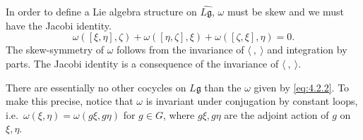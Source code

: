 \documentclass[12pt]{article}
\begin{document}
In order to define a Lie algebra structure on $\widehat{L\mathfrak{g}}$, $\omega$ must be skew and we must have the Jacobi identity. 
\begin{equation}\label{eq:jacobi}
    \omega([\xi,\eta],\zeta) + \omega([\eta,\zeta],\xi) + \omega([\zeta,\xi],\eta) = 0.
\end{equation}
The skew-symmetry of $\omega$ follows from the invariance of $\langle \ , \ \rangle$ and integration by parts. The Jacobi identity is a consequence of the invariance of $\langle \ , \ \rangle$.

There are essentially no other cocycles on $L\mathfrak{g}$ than the $\omega$ given
by \eqref{eq:4.2.2}. To make this precise, notice that $\omega$ is invariant under
conjugation by constant loops, i.e.\ $\omega(\xi,\eta) = \omega(g\xi, g\eta)$
for $g \in G$, where $g\xi, g\eta$ are the adjoint action of $g$ on $\xi,\eta$.
\end{document}
